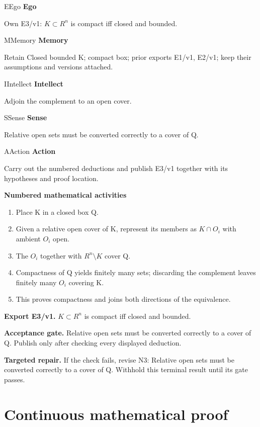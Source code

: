 \documentclass[preprint,12pt,aps,pra,showkeys,amsmath,amssymb,superscriptaddress,floatfix]{revtex4-2}
\theoremstyle{definition}
\theoremstyle{remark}
\newcommand{\mmfaculty}[3]{%
 \begin{mmfacultybox}{#1}{#2}
 {\sffamily\bfseries\color{MMBlue}#2}\par\smallskip #3
 \end{mmfacultybox}}
\newcommand{\field}[2]{\par\smallskip\noindent\textbf{#1.} #2\par}
\begin{document}
\mmfaculty{E}{Ego}{Own E3/v1: \(K\subset R^{n}\) is compact iff closed and bounded.}

\mmfaculty{M}{Memory}{Retain Closed bounded K; compact box; prior exports E1/v1, E2/v1; keep
their assumptions and versions attached.}

\mmfaculty{I}{Intellect}{Adjoin the complement to an open cover.}

\mmfaculty{S}{Sense}{Relative open sets must be converted correctly to a cover of Q.}

\mmfaculty{A}{Action}{Carry out the numbered deductions and publish E3/v1 together with its
hypotheses and proof location.}

\smallskip\noindent\textbf{Numbered mathematical activities}

\begin{enumerate}[label=N3.\arabic*,leftmargin=3.4em]

\item Place K in a closed box Q.

\item Given a relative open cover of K, represent its members as \(K\cap O_i\)
with ambient \(O_i\) open.

\item The \(O_i\) together with \(R^{n}\setminus K\) cover Q.

\item Compactness of Q yields finitely many sets; discarding the complement
leaves finitely many \(O_i\) covering K.

\item This proves compactness and joins both directions of the equivalence.

\end{enumerate}

\field{Export E3/v1}{\(K\subset R^{n}\) is compact iff closed and bounded.}

\field{Acceptance gate}{Relative open sets must be converted correctly to a cover of Q. Publish
only after checking every displayed deduction.}

\field{Targeted repair}{If the check fails, revise N3: Relative open sets must be converted
correctly to a cover of Q. Withhold this terminal result until its gate
passes.}

\endgroup\clearpage\section{Continuous mathematical proof}\label{sec:proof}
\end{document}
